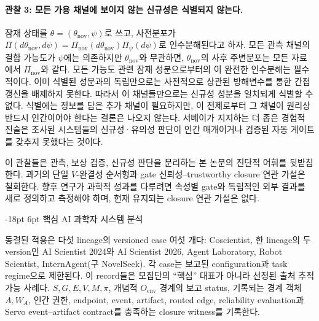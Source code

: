 \documentclass[11pt]{article}
\makeatletter
\renewcommand\section{\@startsection{section}{1}{\z@}%
  {-18pt \@plus -4pt \@minus -2pt}%
  {6pt \@plus 2pt}%
  {\normalfont\large\bfseries}}
\makeatother
\begin{document}
\paragraph{관찰 3: 모든 가용 채널에 보이지 않는 신규성은 식별되지 않는다.}
잠재 상태를 $\theta=(\theta_{\mathrm{nov}},\psi)$로 쓰고, 사전분포가 $\Pi(d\theta_{\mathrm{nov}},d\psi)=\Pi_{\mathrm{nov}}(d\theta_{\mathrm{nov}})\Pi_\psi(d\psi)$로 인수분해된다고 하자. 모든 관측 채널의 결합 가능도가 $\psi$에는 의존하지만 $\theta_{\mathrm{nov}}$와 무관하면, $\theta_{\mathrm{nov}}$의 사후 주변분포는 모든 자료에서 $\Pi_{\mathrm{nov}}$와 같다. 모든 가능도 관련 잠재 성분으로부터의 이 완전한 인수분해는 필수적이다. 이미 식별된 성분과의 독립만으로는 사전적으로 상관된 방해변수를 통한 간접 갱신을 배제하지 못한다. 따라서 이 채널들만으로는 신규성 성분을 일치되게 식별할 수 없다. 식별에는 정보를 담은 추가 채널이 필요하지만, 이 전제로부터 그 채널이 원리상 반드시 인간이어야 한다는 결론은 나오지 않는다. 서베이가 지지하는 더 좁은 경험적 진술은 조사된 시스템들의 신규성·유의성 판단이 인간 매개이거나 검증된 자동 게이트를 갖추지 못했다는 것이다.

이 관찰들은 관측, 보상 검증, 신규성 판단을 분리하는 본 논문의 진단적 어휘를 뒷받침한다. 과거의 단일 $V$-완결성 순서형과 gate 신뢰성--trustworthy closure 연관 가설은 철회한다. 향후 연구가 과학적 성과를 다루려면 속성별 gate와 독립적인 외부 결과를 새로 정의하고 측정해야 하며, 현재 유지되는 closure 연관 가설은 없다.

\section{핵심 AI 과학자 시스템 분석}
\label{sec:core}

동결된 적용은 다섯 lineage의 versioned case 여섯 개다: Coscientist, 한 lineage의 두 version인 AI Scientist 2024와 AI Scientist 2026, Agent Laboratory, Robot Scientist, InternAgent(구 NovelSeek). 각 case는 보고된 configuration과 task regime으로 제한된다. 이 record들은 모집단의 ``핵심'' 대표가 아니라 선정된 출처 추적 가능 사례다. $S,G,E,V,M,\pi$, 개념적 $O_{\mathrm{env}}$ 경계의 보고 status, 기록되는 경계 객체 $A,W_A$, 인간 권한, endpoint, event, artifact, routed edge, reliability evaluation과 Servo event--artifact contract를 충족하는 closure witness를 기록한다.

\begin{table}[t]
\centering
\footnotesize

\caption{다섯 lineage의 versioned case 여섯 개. ID, version, configuration과 task regime은 Servo 정본 record에서 생성된다.}
\label{tab:core-comparison}
\end{table}
\end{document}
